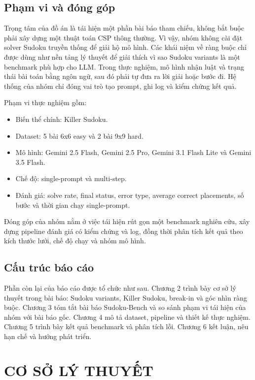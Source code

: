 \documentclass[12pt,a4paper,oneside]{report}
\newlength{\manualparindent}
\newcommand{\manualindent}{\hspace*{\manualparindent}}
\begin{document}
\section{Phạm vi và đóng góp}

\manualindent%
Trọng tâm của đồ án là tái hiện một phần bài báo tham chiếu, không bắt buộc phải xây dựng một thuật toán CSP thông thường. Vì vậy, nhóm không cài đặt solver Sudoku truyền thống để giải hộ mô hình. Các khái niệm về ràng buộc chỉ được dùng như nền tảng lý thuyết để giải thích vì sao Sudoku variants là một benchmark phù hợp cho LLM. Trong thực nghiệm, mô hình nhận luật và trạng thái bài toán bằng ngôn ngữ, sau đó phải tự đưa ra lời giải hoặc bước đi. Hệ thống của nhóm chỉ đóng vai trò tạo prompt, ghi log và kiểm chứng kết quả.

Phạm vi thực nghiệm gồm:

\begin{itemize}
  \item Biến thể chính: Killer Sudoku.
  \item Dataset: 5 bài 6x6 easy và 2 bài 9x9 hard.
  \item Mô hình: Gemini 2.5 Flash, Gemini 2.5 Pro, Gemini 3.1 Flash Lite và Gemini 3.5 Flash.
  \item Chế độ: single-prompt và multi-step.
  \item Đánh giá: solve rate, final status, error type, average correct placements, số bước và thời gian chạy single-prompt.
\end{itemize}

Đóng góp của nhóm nằm ở việc tái hiện rút gọn một benchmark nghiên cứu, xây dựng pipeline đánh giá có kiểm chứng và log, đồng thời phân tích kết quả theo kích thước lưới, chế độ chạy và nhóm mô hình.

\section{Cấu trúc báo cáo}

\manualindent%
Phần còn lại của báo cáo được tổ chức như sau. Chương 2 trình bày cơ sở lý thuyết trong bài báo: Sudoku variants, Killer Sudoku, break-in và góc nhìn ràng buộc. Chương 3 tóm tắt bài báo Sudoku-Bench và so sánh phạm vi tái hiện của nhóm với bài báo gốc. Chương 4 mô tả dataset, pipeline và thiết kế thực nghiệm. Chương 5 trình bày kết quả benchmark và phân tích lỗi. Chương 6 kết luận, nêu hạn chế và hướng phát triển.

\chapter{CƠ SỞ LÝ THUYẾT}
\end{document}
